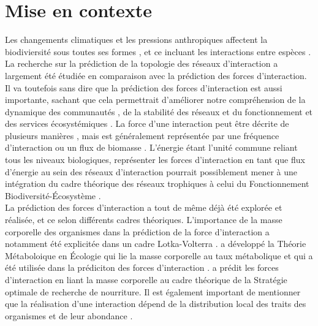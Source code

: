 \documentclass[12pt]{article}
\begin{document}



\section{Mise en contexte}
Les changements climatiques et les pressions anthropiques affectent la biodiviersité sous toutes ses formes \cite{Diaz-01SumPol}, et ce incluant les interactions entre espèces \cite{Estes2011TroDow, Purves2013TimMod, Woodward2010CliCha}. La recherche sur la prédiction de la topologie des réseaux d'interaction a largement été étudiée en comparaison avec la prédiction des forces d'interaction. Il va toutefois sans dire que la prédiction des forces d'interaction est aussi importante, sachant que cela permettrait d'améliorer notre compréhension de la dynamique des communautés \cite{Paine1992FooAna}, de la stabilité des réseaux \cite{Neutel2002StaRea, deRuiter1995EnePat} et du fonctionnement et des services écosystémiques \cite{Duffy2002Bioeco, Montoya2003FooWeb}. La force d'une interaction peut être décrite de plusieurs manières \cite{Berlow2004IntStr}, mais est généralement représentée par une fréquence d'interaction ou un flux de biomasse \cite{Heleno2014EcoNet}. L'énergie étant l'unité commune reliant tous les niveaux biologiques, représenter les forces d'interaction en tant que flux d'énergie au sein des réseaux d'interaction pourrait possiblement mener à une intégration du cadre théorique des réseaux trophiques à celui du Fonctionnement Biodiversité-Écosystème \cite{Barnes2018EneFlu}.\\

La prédiction des forces d'interaction a tout de même déjà été explorée et réalisée, et ce selon différents cadres théoriques. L'importance de la masse corporelle des organismes dans la prédiction de la force d'interaction a notamment été explicitée dans un cadre Lotka-Volterra \cite{Yodzis1992BodSiz, Pawar2015RolBod,Emmerson2004PrePre}.\citet{Brown2004MetThe} a développé la Théorie Métaboloique en Écologie qui lie la masse corporelle au taux métabolique et qui a été utilisée dans la prédiciton des forces d'interaction \cite{Berlow2009SimPre}. \cite{Brose2010BodCon} a prédit les forces d'interaction en liant la masse corporelle au cadre théorique de la Stratégie optimale de recherche de nourriture. Il est également important de mentionner que la réalisation d'une interaction dépend de la distribution local des traits des organismes et de leur abondance \cite{Poisot2015SpeWhy}.\\
\end{document}
